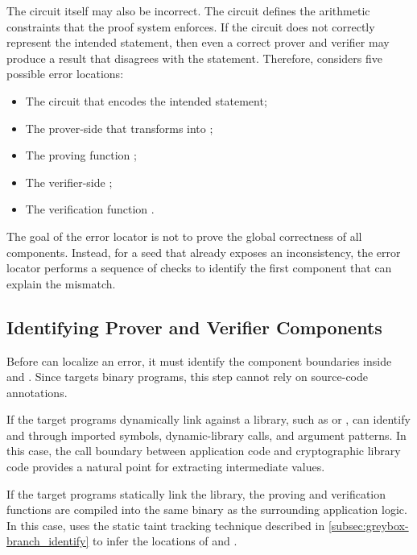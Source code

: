 The circuit itself may also be incorrect. The circuit defines the arithmetic constraints that the proof system enforces. If the circuit does not correctly represent the intended statement, then even a correct prover and verifier may produce a result that disagrees with the \zksnark statement. Therefore, \greyboxfuzz considers five possible error locations:

\begin{itemize}[leftmargin=*]
    \setlength{\itemsep}{0pt}
    \setlength{\parskip}{0pt}
    \item The circuit that encodes the intended statement;
    \item The prover-side  that transforms \witnessorg into \witnessint;
    \item The \zksnark proving function \pfunc;
    \item The verifier-side ;
    \item The \zksnark verification function \vfunc.
\end{itemize}

The goal of the error locator is not to prove the global correctness of all components. Instead, for a seed that already exposes an inconsistency, the error locator performs a sequence of checks to identify the first component that can explain the mismatch.

\subsection{Identifying Prover and Verifier Components}

Before \greyboxfuzz can localize an error, it must identify the component boundaries inside \pprog and \vprog. Since \greyboxfuzz targets binary programs, this step cannot rely on source-code annotations.

If the target programs dynamically link against a \zksnark library, such as \libsnark or \bellman, \greyboxfuzz can identify \pfunc and \vfunc through imported symbols, dynamic-library calls, and argument patterns. In this case, the call boundary between application code and cryptographic library code provides a natural point for extracting intermediate values.

If the target programs statically link the \zksnark library, the proving and verification functions are compiled into the same binary as the surrounding application logic. In this case, \greyboxfuzz uses the static taint tracking technique described in \autoref{subsec:greybox-branch_identify} to infer the locations of \pfunc and \vfunc.

